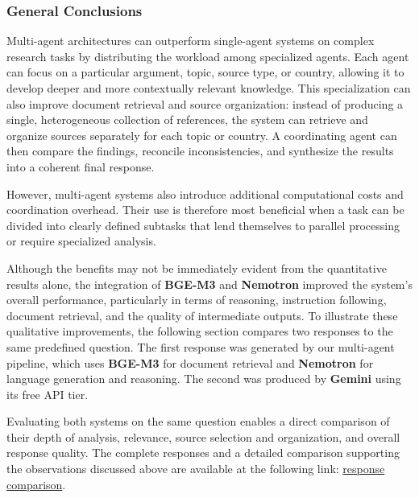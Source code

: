 \documentclass[a4paper,12pt]{report}
\begin{document}
\subsubsection{General Conclusions}

Multi-agent architectures can outperform single-agent systems on complex research tasks by distributing the workload among specialized agents. Each agent can focus on a particular argument, topic, source type, or country, allowing it to develop deeper and more contextually relevant knowledge. This specialization can also improve document retrieval and source organization: instead of producing a single, heterogeneous collection of references, the system can retrieve and organize sources separately for each topic or country. A coordinating agent can then compare the findings, reconcile inconsistencies, and synthesize the results into a coherent final response.

However, multi-agent systems also introduce additional computational costs and coordination overhead. Their use is therefore most beneficial when a task can be divided into clearly defined subtasks that lend themselves to parallel processing or require specialized analysis.

Although the benefits may not be immediately evident from the quantitative results alone, the integration of \textbf{BGE-M3} and \textbf{Nemotron} improved the system's overall performance, particularly in terms of reasoning, instruction following, document retrieval, and the quality of intermediate outputs. To illustrate these qualitative improvements, the following section compares two responses to the same predefined question. The first response was generated by our multi-agent pipeline, which uses \textbf{BGE-M3} for document retrieval and \textbf{Nemotron} for language generation and reasoning. The second was produced by \textbf{Gemini} using its free API tier.

Evaluating both systems on the same question enables a direct comparison of their depth of analysis, relevance, source selection and organization, and overall response quality. The complete responses and a detailed comparison supporting the observations discussed above are available at the following link: \href{https://github.com/GioDeFra/ReportTextMining/blob/505c8bded7e9827ccd361b13208449fa5f1933b4/multiagent-model-answer-comparison.pdf}{response comparison}.
\end{document}
